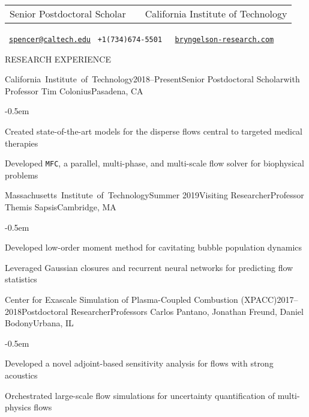 \documentclass{resume} %
\newcommand{\phonesymbol}{\faPhone}
\newcommand{\homepagesymbol}{\faHome}
\newcommand{\emailsymbol}{\faEnvelope}
\newcommand{\sepss}{-0.5em}
\newcommand{\negspace}{-0.8em}
\newcommand\Caltech{\mbox{California Institute of Technology}}
\newcommand\MIT{\mbox{Massachusetts Institute of Technology}}
\begin{document}
\begin{center}
	\vspace*{-1cm}
	\setlength\tabcolsep{3pt}
	\begin{tabu}{ r c l }
	Senior Postdoctoral Scholar & \textbar & California Institute of Technology  
	\end{tabu}
	
	\vspace{-0.15cm}
    \emailsymbol \, \href{mailto:spencer@caltech.edu}{\tt spencer@caltech.edu} \quad 
    \phonesymbol \, \tt +1(734)674-5501 \quad
    \homepagesymbol \, \href{https://bryngelson-research.com}{bryngelson-research.com}
\end{center}

\begin{rSection}{{\Large R}ESEARCH EXPERIENCE}

\begin{myrSubsections}{\Caltech}{2018--Present}{Senior Postdoctoral Scholar}{with Professor Tim Colonius}{Pasadena, CA} 
	\begin{list}{\textbullet}{\leftmargin=2.5em} 
	  	\itemsep \sepss 
	  	\vspace{\negspace} 
		\item Created state-of-the-art models for the disperse flows central to targeted medical therapies
        \item Developed \texttt{MFC}, a parallel, multi-phase, and multi-scale flow solver for biophysical problems
  	\end{list}
\end{myrSubsections}

\begin{myrSubsections}{\MIT}{Summer 2019}{Visiting Researcher}{Professor Themis Sapsis}{Cambridge, MA} 
	\begin{list}{\textbullet}{\leftmargin=2.5em} 
	  	\itemsep \sepss 
	  	\vspace{\negspace} 
		\item Developed low-order moment method for cavitating bubble population dynamics
        \item Leveraged Gaussian closures and recurrent neural networks for predicting flow statistics
  	\end{list}
\end{myrSubsections}

\begin{myrSubsections}{Center for Exascale Simulation of Plasma-Coupled Combustion (XPACC)}{2017--2018}{Postdoctoral Researcher}{Professors Carlos Pantano, Jonathan Freund, Daniel Bodony}{Urbana, IL}
	\begin{list}{\textbullet}{\leftmargin=2.5em} 
	  	\itemsep \sepss 
	  	\vspace{\negspace} 
     	\item Developed a novel adjoint-based sensitivity analysis for flows with strong acoustics
		\item Orchestrated large-scale flow simulations for uncertainty quantification of multi-physics flows
  	\end{list}
\end{myrSubsections}


\end{rSection}
\end{document}
